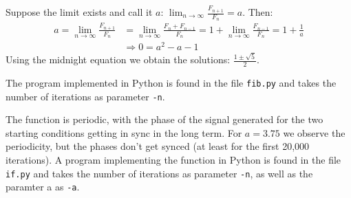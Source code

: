 \documentclass[10pt,a4paper,boxed]{hmcpset}
\begin{document}
\begin{problem}[Assignment 35]
\end{problem}
\begin{solution}
Suppose the limit exists and call it $a$: $\lim_{n \rightarrow \infty} \frac{F_{n+1}}{F_n} = a$. Then:
\begin{align*}
	a = \lim_{n \rightarrow \infty} \frac{F_{n+1}}{F_n} & = \lim_{n \rightarrow \infty} \frac{F_{n}+F_{n-1}}{F_n} = 1 + \lim_{n \rightarrow \infty} \frac{F_{n-1}}{F_n} = 1 + \frac{1}{a} \\
	& \Rightarrow 0 = a^2 - a - 1 
\end{align*}
Using the midnight equation we obtain the solutions: $\frac{1 \pm \sqrt{5}}{2}$.

The program implemented in Python is found in the file \verb|fib.py| and takes the number of iterations as parameter \verb|-n|.
\end{solution}

\begin{problem}[Assignment 36]
\end{problem}
\begin{solution}
The function is periodic, with the phase of the signal generated for the two starting conditions getting in sync in the long term. For $a=3.75$ we observe the periodicity, but the phases don't get synced (at least for the first 20,000 iterations). 
A program implementing the function in Python is found in the file \verb|if.py| and takes the number of iterations as parameter \verb|-n|, as well as the paramter a as \verb|-a|.
\end{solution}
\end{document}

